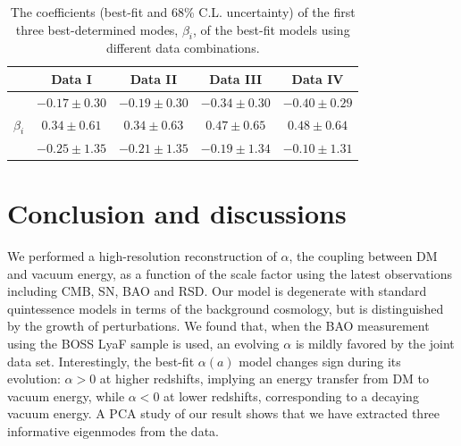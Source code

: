 \documentclass[prd,twocolumn,preprintnumbers,amsmath,amssymb,nofootinbib,english,showpacs]{revtex4-1}
\begin{document}
\begin{table}
\begin{center}
\begin{tabular}{c|c|c|c|c}
\hline \hline
                    &Data I & Data II & Data III & Data IV \\ \hline
                    &$-0.17\pm 0.30$ &
                      $-0.19 \pm 0.30$ &
                      $-0.34 \pm 0.30$&
                      $-0.40 \pm 0.29$ \\
$\beta_i$    &$0.34 \pm 0.61$&
                     $0.34 \pm 0.63$ &
                     $0.47 \pm 0.65$&
                     $0.48 \pm 0.64$ \\
                  &$-0.25 \pm 1.35$&
                    $-0.21 \pm 1.35$&
                    $-0.19 \pm 1.34$&
                    $-0.10 \pm 1.31$\\
\hline\hline
\end{tabular}
\caption{The coefficients (best-fit and 68\% C.L. uncertainty) of the first three best-determined modes, $\beta_i$, of the best-fit models using different data combinations.}\label{tab:coeff}
\end{center}
\end{table}

\section{Conclusion and discussions}

We performed a high-resolution reconstruction of $\alpha$, the coupling between DM and vacuum energy, as a function of the scale factor using the latest observations including CMB, SN, BAO and RSD. Our model is degenerate with standard quintessence models in terms of the background cosmology, but is distinguished by the growth of perturbations. We found that, when the BAO measurement using the BOSS LyaF sample \cite{Aubourg:2014Nov} is used, an evolving $\alpha$ is mildly favored by the joint data set. Interestingly, the best-fit $\alpha(a)$ model changes sign during its evolution: $\alpha>0$ at higher redshifts, implying an energy transfer from DM to vacuum energy, while $\alpha<0$ at lower redshifts, corresponding to a decaying vacuum energy. A PCA study of our result shows that we have extracted three informative eigenmodes from the data.
\end{document}
